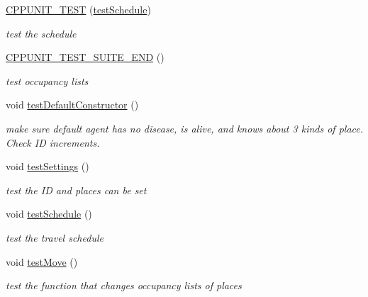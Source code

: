 \begin{DoxyCompactItemize}
\mbox{\label{classagentTest_a6558275101998971b56abdd2a323623d}} 
\mbox{\hyperlink{classagentTest_a6558275101998971b56abdd2a323623d}{C\+P\+P\+U\+N\+I\+T\+\_\+\+T\+E\+ST}} (\mbox{\hyperlink{classagentTest_adaa25e2c092be46311aea330d19d7f94}{test\+Schedule}})
\begin{DoxyCompactList}\small\item\em test the schedule \end{DoxyCompactList}\item 
\mbox{\hyperlink{classagentTest_a51ff7b623cb89bce6fa8bab5f8af04b7}{C\+P\+P\+U\+N\+I\+T\+\_\+\+T\+E\+S\+T\+\_\+\+S\+U\+I\+T\+E\+\_\+\+E\+ND}} ()
\begin{DoxyCompactList}\small\item\em test occupancy lists \end{DoxyCompactList}\item 
void \mbox{\hyperlink{classagentTest_ade6fc2895d439529b21d4fb725302b77}{test\+Default\+Constructor}} ()
\begin{DoxyCompactList}\small\item\em make sure default agent has no disease, is alive, and knows about 3 kinds of place. Check ID increments. \end{DoxyCompactList}\item 
\mbox{\label{classagentTest_ad39e9d21138b56f55a29ced6fdba8e58}} 
void \mbox{\hyperlink{classagentTest_ad39e9d21138b56f55a29ced6fdba8e58}{test\+Settings}} ()
\begin{DoxyCompactList}\small\item\em test the ID and places can be set \end{DoxyCompactList}\item 
\mbox{\label{classagentTest_adaa25e2c092be46311aea330d19d7f94}} 
void \mbox{\hyperlink{classagentTest_adaa25e2c092be46311aea330d19d7f94}{test\+Schedule}} ()
\begin{DoxyCompactList}\small\item\em test the travel schedule \end{DoxyCompactList}\item 
\mbox{\label{classagentTest_a7207d3076716ba24d42ebac5b97a6f6e}} 
void \mbox{\hyperlink{classagentTest_a7207d3076716ba24d42ebac5b97a6f6e}{test\+Move}} ()
\begin{DoxyCompactList}\small\item\em test the function that changes occupancy lists of places \end{DoxyCompactList}\item 

\end{DoxyCompactItemize}

